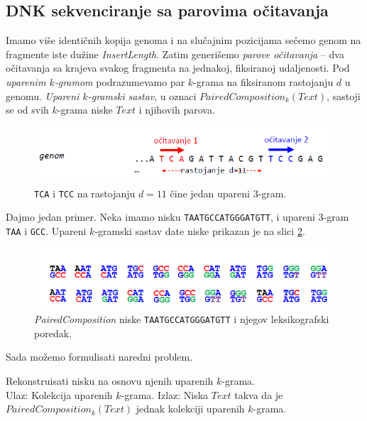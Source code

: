 \subsection{DNK sekvenciranje sa parovima očitavanja} 

Imamo više identičnih kopija genoma i na slučajnim pozicijama sečemo genom na fragmente iste dužine \textit{InsertLength}. Zatim generišemo \emph{parove očitavanja} -- dva očitavanja sa krajeva svakog fragmenta na jednakoj, fiksiranoj udaljenosti. Pod \emph{uparenim $k$-gramom} podrazumevamo par $k$-grama na fiksiranom rastojanju $d$ u genomu. \emph{Upareni $k$-gramski sastav}, u oznaci $PairedComposition_k(Text)$, sastoji se od svih $k$-grama niske $Text$ i njihovih parova.

\begin{figure}[h]
	\centering
	\includegraphics[width=1\textwidth]{poglavlja/3/slike/upareni_kgram.png}
	\caption{\texttt{TCA} i \texttt{TCC} na rastojanju $d=11$ čine jedan upareni 3-gram.}
	\label{slika:upareni}
\end{figure} 

Dajmo jedan primer. Neka imamo nisku \texttt{TAATGCCATGGGATGTT}, i upareni 3-gram \texttt{TAA} i \texttt{GCC}. Upareni $k$-gramski sastav date niske prikazan je na slici \ref{slika:upareni3}.

\begin{figure}[h]
	\centering
	\includegraphics[width=1\textwidth]{poglavlja/3/slike/upareni_3gram.png}
	\caption{\emph{PairedComposition} niske \texttt{TAATGCCATGGGATGTT} i njegov leksikografski poredak.}
	\label{slika:upareni3}
\end{figure} 

Sada mo\v zemo formulisati naredni problem.

\begin{problem}
	Rekonstruisati nisku na osnovu njenih uparenih $k$-grama. \\
	Ulaz: Kolekcija uparenih $k$-grama.
	Izlaz: Niska $Text$ takva da je $PairedComposition_k(Text)$ jednak kolekciji uparenih $k$-grama. 
\end{problem}

